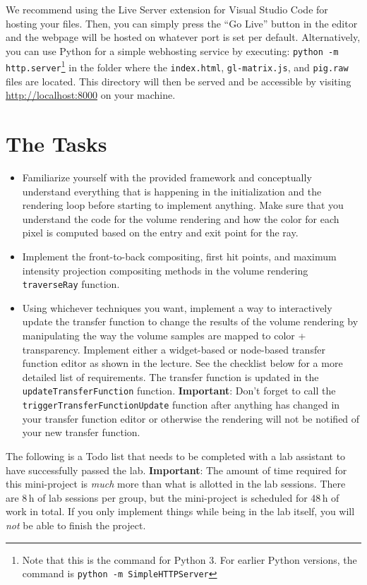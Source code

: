 \documentclass{labinstructions}
\begin{document}
We recommend using the Live Server extension for Visual Studio Code for hosting your files. Then, you can simply press the  ``Go Live'' button in the editor and the webpage will be hosted on whatever port is set per default.  
Alternatively, you can use Python for a simple webhosting service by executing: \texttt{python -m http.server}\footnote{Note that this is the command for Python 3. For earlier Python versions, the command is \texttt{python -m SimpleHTTPServer}} in the folder where the \texttt{index.html}, \texttt{gl-matrix.js}, and \texttt{pig.raw} files are located.  This directory will then be served and be accessible by visiting \href{http://localhost:8000}{http://localhost:8000} on your machine. 


\section{The Tasks}
\begin{itemize}
  \item Familiarize yourself with the provided framework and conceptually understand everything that is happening in the initialization and the rendering loop before starting to implement anything. Make sure that you understand the code for the volume rendering and how the color for each pixel is computed based on the entry and exit point for the ray. 
  \item Implement the front-to-back compositing, first hit points, and maximum intensity projection compositing methods in the volume rendering \texttt{traverseRay} function.
  \item Using whichever techniques you want, implement a way to interactively update the transfer function to change the results of the volume rendering by manipulating the way the volume samples are mapped to color + transparency.  Implement either a widget-based or node-based transfer function editor as shown in the lecture.  See the checklist below for a more detailed list of requirements.  The transfer function is updated in the \texttt{updateTransferFunction} function.  \textbf{Important}:  Don't forget to call the \texttt{triggerTransferFunctionUpdate} function after anything has changed in your transfer function editor or otherwise the rendering will not be notified of your new transfer function.
\end{itemize}

The following is a Todo list that needs to be completed with a lab assistant to have successfully passed the lab.  \textbf{Important}:  The amount of time required for this mini-project is \emph{much} more than what is allotted in the lab sessions.  There are 8\,h of lab sessions per group, but the mini-project is scheduled for 48\,h of work in total.  If you only implement things while being in the lab itself, you will \emph{not} be able to finish the project.
\end{document}
